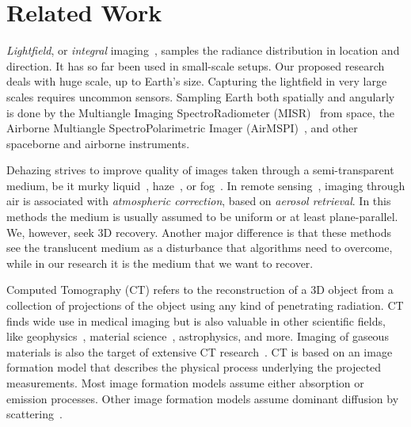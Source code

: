 \documentclass[10pt,letterpaper]{article}
\begin{document}

\section{Related Work}
\label{sec:literature}

{\em Lightfield}, or {\em integral}
imaging~\cite{Ng2006,bishop,Ng1948}, samples the radiance distribution
in location and direction. It has so far been used in small-scale
setups. Our proposed research deals with huge scale, up to Earth's
size. Capturing the lightfield in very large scales requires uncommon
sensors. Sampling Earth both spatially and angularly is done by the
Multiangle Imaging SpectroRadiometer (MISR)~\cite{Martonchikc} from
space, the Airborne Multiangle SpectroPolarimetric
Imager (AirMSPI)~\cite{dinerDavis10}, and other spaceborne and
airborne instruments.

Dehazing strives to improve quality of images taken through a
semi-transparent medium, be it murky liquid~\cite{kim,fuchs},
haze~\cite{fattal,Hschechner2}, or fog~\cite{narasimhan2}.  In remote
sensing~\cite{kokhan}, imaging through air is associated with {\em
  atmospheric correction}, based on {\em aerosol retrieval}.  In this
methods the medium is usually assumed to be uniform or at least
plane-parallel.  We, however, seek 3D recovery.  Another major
difference is that these methods see the translucent medium as a
disturbance that algorithms need to overcome, while in our research it
is the medium that we want to recover.

Computed Tomography (CT) refers to the reconstruction of a 3D object
from a collection of projections of the object using any kind of
penetrating radiation. CT finds wide use in medical imaging but is
also valuable in other scientific fields, like
geophysics~\cite{Kazahaya2008}, material science~\cite{Baruchel2000},
astrophysics, and more.  Imaging of gaseous materials is also the
target of extensive CT research~\cite{Price2001,Cosofret2009}. CT is
based on an image formation model that describes the physical process
underlying the projected measurements.  Most image formation models
assume either absorption or emission processes. Other image formation
models assume dominant diffusion by scattering~\cite{Boas2001}.
\end{document}
